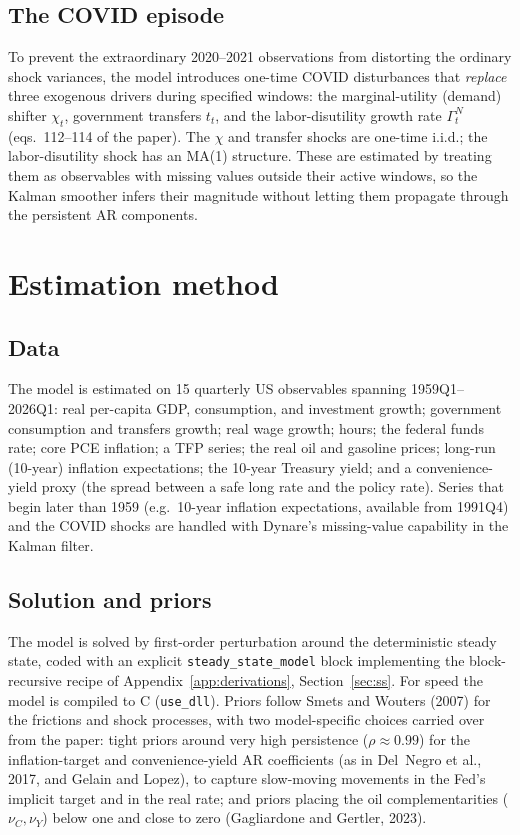 \documentclass[11pt]{article}
\theoremstyle{definition}
\begin{document}
\subsection{The COVID episode}
To prevent the extraordinary 2020--2021 observations from distorting the ordinary shock variances, the
model introduces one-time COVID disturbances that \emph{replace} three exogenous drivers during
specified windows: the marginal-utility (demand) shifter $\chi_t$, government transfers $t_t$, and the
labor-disutility growth rate $\Gamma^N_t$ (eqs.\ 112--114 of the paper). The $\chi$ and transfer shocks
are one-time i.i.d.; the labor-disutility shock has an MA(1) structure. These are estimated by treating
them as observables with missing values outside their active windows, so the Kalman smoother infers
their magnitude without letting them propagate through the persistent AR components.

\section{Estimation method}\label{sec:estimation}

\subsection{Data}
The model is estimated on 15 quarterly US observables spanning 1959Q1--2026Q1: real per-capita GDP,
consumption, and investment growth; government consumption and transfers growth; real wage growth; hours;
the federal funds rate; core PCE inflation; a TFP series; the real oil and gasoline prices; long-run
(10-year) inflation expectations; the 10-year Treasury yield; and a convenience-yield proxy (the spread
between a safe long rate and the policy rate). Series that begin later than 1959 (e.g.\ 10-year
inflation expectations, available from 1991Q4) and the COVID shocks are handled with Dynare's
missing-value capability in the Kalman filter.

\subsection{Solution and priors}
The model is solved by first-order perturbation around the deterministic steady state, coded with an
explicit \texttt{steady\_state\_model} block implementing the block-recursive recipe of
Appendix~\ref{app:derivations}, Section~\ref{sec:ss}. For speed the model is compiled to C
(\texttt{use\_dll}). Priors follow Smets and Wouters (2007) for the frictions and shock processes, with
two model-specific choices carried over from the paper: tight priors around very high persistence
($\rho\approx 0.99$) for the inflation-target and convenience-yield AR coefficients (as in Del~Negro
et al., 2017, and Gelain and Lopez), to capture slow-moving movements in the Fed's implicit target and
in the real rate; and priors placing the oil complementarities ($\nu_C,\nu_Y$) below one and close to
zero (Gagliardone and Gertler, 2023).
\end{document}

